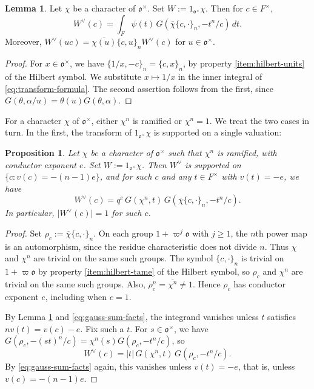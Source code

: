 \documentclass[reqno]{amsart}
\theoremstyle{plain}
\newtheorem{proposition}[theorem]{Proposition}
\theoremstyle{definition}
\theoremstyle{itplain}
\newtheorem{lemma}[theorem]{Lemma}
\numberwithin{equation}{section}
\numberwithin{theorem}{section}
\begin{document}
\begin{lemma}\label{lemma:twisted-reduction}
  Let $\chi$ be a character of $\mathfrak{o}^\times$.  Set $W := 1_{\mathfrak{o}^\times} \chi$.  Then for $c \in F^\times$,
  \begin{equation*}
    W^\vee(c) = \int_F \psi(t) \, G( \overline{\chi} \{c, \cdot\}_n, - t^n / c) \, d t.
  \end{equation*}
  Moreover, $W^\vee(u c) = \overline{\chi(u)} \{c, u\}_n W^\vee(c)$ for $u \in \mathfrak{o}^\times$.
\end{lemma}
\begin{proof}
  For $x \in \mathfrak{o}^\times$, we have $\{1/x, -c\}_n = \{c, x\}_n$, by property \eqref{item:hilbert-units} of the Hilbert symbol.  We substitute $x \mapsto 1/x$ in the inner integral of \eqref{eq:transform-formula}.  The second assertion follows from the first, since $G(\theta, \alpha / u) = \theta(u) G(\theta, \alpha)$.
\end{proof}

For a character $\chi$ of $\mathfrak{o}^\times$, either $\chi^n$ is ramified or $\chi^n = 1$.  We treat the two cases in turn.  In the first, the transform of $1_{\mathfrak{o}^\times} \chi$ is supported on a single valuation:

\begin{proposition}\label{proposition:twisted-vector}
  Let $\chi$ be a character of $\mathfrak{o}^\times$ such that $\chi^n$ is ramified, with conductor exponent $e$.  Set $W := 1_{\mathfrak{o}^\times} \chi$.  Then $W^\vee$ is supported on $\{c : v(c) = - (n-1) e\}$, and for such $c$ and any $t \in F^\times$ with $v(t) = -e$, we have
  \begin{equation*}
    W^\vee(c) =
    q^{e} \,
    G(\chi^n, t) \,
    G( \overline{\chi} \{c, \cdot\}_n, - t^n / c).
  \end{equation*}
  In particular, $\lvert W^\vee(c) \rvert = 1$ for such $c$.
\end{proposition}
\begin{proof}
  Set $\rho_c := \overline{\chi} \{c, \cdot\}_n$.  On each group $1 + \varpi^j \mathfrak{o}$ with $j \geq 1$, the $n$th power map is an automorphism, since the residue characteristic does not divide $n$.  Thus $\chi$ and $\chi^n$ are trivial on the same such groups.  The symbol $\{c, \cdot\}_n$ is trivial on $1 + \varpi \mathfrak{o}$ by property \eqref{item:hilbert-tame} of the Hilbert symbol, so $\rho_c$ and $\chi^n$ are trivial on the same such groups.  Also, $\rho_c^n = \overline{\chi^n} \neq 1$.  Hence $\rho_c$ has conductor exponent $e$, including when $e = 1$.

  By Lemma \ref{lemma:twisted-reduction} and \eqref{eq:gauss-sum-facts}, the integrand vanishes unless $t$ satisfies $n v(t) = v(c) - e$.  Fix such a $t$.  For $s \in \mathfrak{o}^\times$, we have $G(\rho_c, - (s t)^n / c) = \chi^n(s) G(\rho_c, - t^n / c)$, so
  \begin{equation*}
    W^\vee(c) = \lvert t \rvert \, G(\chi^n, t) \, G(\rho_c, - t^n / c).
  \end{equation*}
  By \eqref{eq:gauss-sum-facts} again, this vanishes unless $v(t) = - e$, that is, unless $v(c) = -(n-1) e$.
\end{proof}
\end{document}
